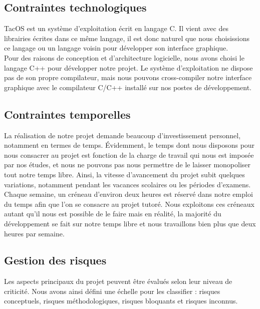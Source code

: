 
\subsection{Contraintes technologiques}

TacOS est un système d'exploitation écrit en langage C. Il vient avec des librairies écrites dans ce même langage, il est donc naturel que nous choisissions ce langage ou un langage voisin pour développer son interface graphique.\\

Pour des raisons de conception et d'architecture logicielle, nous avons choisi le langage C++ pour développer notre projet. Le système d'exploitation ne dispose pas de son propre compilateur, mais nous pouvons cross-compiler notre interface graphique avec le compilateur C/C++ installé sur nos postes de développement.

\subsection{Contraintes temporelles}

La réalisation de notre projet demande beaucoup d'investissement personnel, notamment en termes de temps. Évidemment, le temps dont nous disposons pour nous consacrer au projet est fonction de la charge de travail qui nous est imposée par nos études, et nous ne pouvons pas nous permettre de le laisser monopoliser tout notre temps libre. Ainsi, la vitesse d'avancement du projet subit quelques variations, notamment pendant les vacances scolaires ou les périodes d'examens.\\

Chaque semaine, un créneau d'environ deux heures est réservé dans notre emploi du temps afin que l'on se consacre au projet tutoré. Nous exploitons ces créneaux autant qu'il nous est possible de le faire mais en réalité, la majorité du développement se fait sur notre temps libre et nous travaillons bien plus que deux heures par semaine.

\subsection{Gestion des risques}
  Les aspects principaux du projet peuvent être évalués selon leur niveau de criticité. Nous avons ainsi défini une échelle pour les classifier : risques conceptuels, risques méthodologiques, risques bloquants et risques inconnus.

